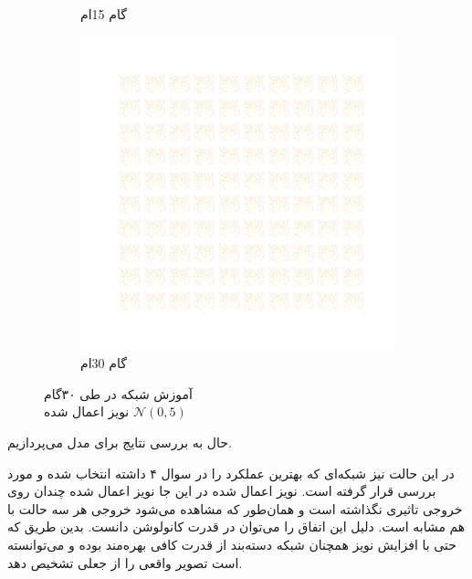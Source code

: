 \documentclass[12pt, a4paper]{book}
\begin{document}
\begin{figure}[h]
\begin{subfigure}{0.3\linewidth}
        \caption{گام 15ام}
    \end{subfigure}
    \begin{subfigure}{0.3\linewidth}
        \includegraphics[width=\linewidth]{images/fcgan/noisy_std5.0/generated_img_30.png}
        \caption{گام 30ام}
    \end{subfigure}
    \caption{آموزش شبکه  در طی ۳۰گام\\ نویز اعمال شده $\mathcal{N}(0,5)$}
    \label{fcgan_noisy_std5.0}
\end{figure}

حال به بررسی نتایج برای مدل  می‌پردازیم.

در این حالت نیز شبکه‌ای که بهترین عملکرد را در سوال ۴ داشته انتخاب شده و مورد بررسی قرار گرفته است.
نویز اعمال شده در این جا نویز اعمال شده چندان روی خروجی تاثیری نگذاشته است و همان‌طور که مشاهده می‌شود
خروجی هر سه حالت با هم مشابه است. دلیل این اتفاق را می‌توان در قدرت کانولوشن دانست. بدین طریق که
حتی با افزایش نویز همچنان شبکه دسته‌بند از قدرت کافی بهره‌مند بوده و می‌توانسته است تصویر واقعی را از جعلی
تشخیص دهد.
\end{document}

